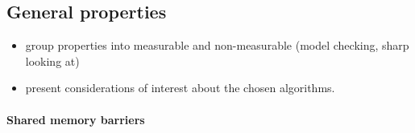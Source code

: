 \documentclass[a4paper, 10pt]{article}
\begin{document}
\subsection{General properties}
\label{ssec:analysis-general}
\begin{itemize}
	\item group properties into measurable and non-measurable (model checking, sharp looking at)
	\item present considerations of interest about the chosen algorithms.
\end{itemize}

\paragraph{Shared memory barriers}
\label{sssec:analysis-general-shared}
\end{document}
